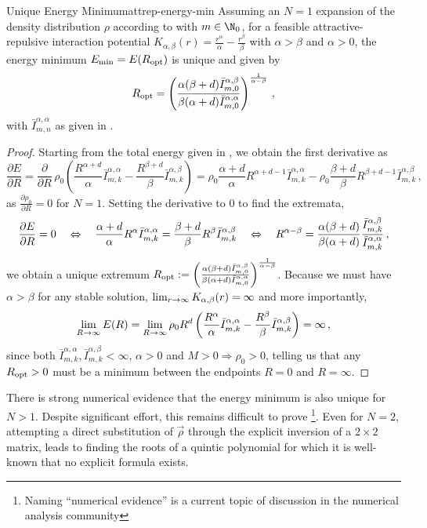 \begin{lemma}{Unique Energy Minimum}{attrep-energy-min}
  Assuming an $N=1$ expansion of the density distribution $\rho$ according to  with $m \in \N_0$, for a feasible attractive-repulsive interaction potential $K_{\alpha, \beta}(r) = \frac{r^\alpha}{\alpha} - \frac{r^\beta}{\beta}$ with $\alpha > \beta$ and $\alpha > 0$, the energy minimum $E_{\rm min} = E(R_{\rm opt})$ is unique and given by
  $$R_{\rm opt} = \left(\frac{\alpha(\beta+d) \bar{I}_{m,0}^{\alpha,\beta}}{\beta(\alpha+d) \bar{I}_{m,0}^{\alpha,\alpha}}\right)^\frac{1}{\alpha-\beta}\,,$$
  with $\bar{I}_{m,n}^{\alpha,\alpha}$ as given in .
\end{lemma}
\begin{proof}
  Starting from the total energy given in , we obtain the first derivative as
  $$\frac{\partial E}{\partial R} = \frac{\partial}{\partial R}\, \rho_0 \left(\frac{R^{\alpha+d}}{\alpha} \bar{I}_{m,k}^{\alpha,\alpha} - \frac{R^{\beta+d}}{\beta} \bar{I}_{m,k}^{\alpha,\beta}\right) = \rho_0 \frac{\alpha+d}{\alpha} R^{\alpha+d-1} \bar{I}_{m,k}^{\alpha,\alpha} - \rho_0 \frac{\beta+d}{\beta} R^{\beta+d-1} \bar{I}_{m,k}^{\alpha,\beta}\,,$$
  as $\frac{\partial \rho_0}{\partial R} = 0$ for $N = 1$.
  Setting the derivative to $0$ to find the extremata,
  $$\frac{\partial E}{\partial R} = 0 \quad\Leftrightarrow\quad \frac{\alpha+d}{\alpha} R^{\alpha} \bar{I}_{m,k}^{\alpha,\alpha} = \frac{\beta+d}{\beta} R^{\beta} \bar{I}_{m,k}^{\alpha,\beta} \quad\Leftrightarrow\quad R^{\alpha-\beta} = \frac{\alpha (\beta+d)}{\beta(\alpha+d)} \frac{\bar{I}_{m,k}^{\alpha,\beta}}{\bar{I}_{m,k}^{\alpha,\alpha}}\,,$$
  we obtain a unique extremum $R_{\rm opt} := \left(\frac{\alpha(\beta+d) \bar{I}_{m,0}^{\alpha,\beta}}{\beta(\alpha+d) \bar{I}_{m,0}^{\alpha,\alpha}}\right)^\frac{1}{\alpha-\beta}$.
  Because we must have $\alpha > \beta$ for any stable solution, $\lim_{r \rightarrow \infty} K_{\alpha,\beta}(r) = \infty$ and more importantly,
  $$\lim_{R \rightarrow \infty} E(R) = \lim_{R \rightarrow \infty} \rho_0 R^d \left(\frac{R^{\alpha}}{\alpha} \bar{I}_{m,k}^{\alpha,\alpha} - \frac{R^{\beta}}{\beta} \bar{I}_{m,k}^{\alpha,\beta}\right) = \infty\,,$$
  since both $\bar{I}_{m,k}^{\alpha,\alpha}, \bar{I}_{m,k}^{\alpha,\beta} < \infty$, $\alpha > 0$ and $M > 0 \Rightarrow \rho_0 > 0$, telling us that any $R_{\rm opt} > 0$ must be a minimum between the endpoints $R = 0$ and $R = \infty$.
\end{proof}

There is strong numerical evidence that the energy minimum is also unique for $N > 1$.
Despite significant effort, this remains difficult to prove \footnote{Naming ``numerical evidence'' is a current topic of discussion in the numerical analysis community}.
Even for $N = 2$, attempting a direct substitution of $\vec{\rho}$ through the explicit inversion of a $2 \times 2$ matrix, leads to finding the roots of a quintic polynomial for which it is well-known that no explicit formula exists.

